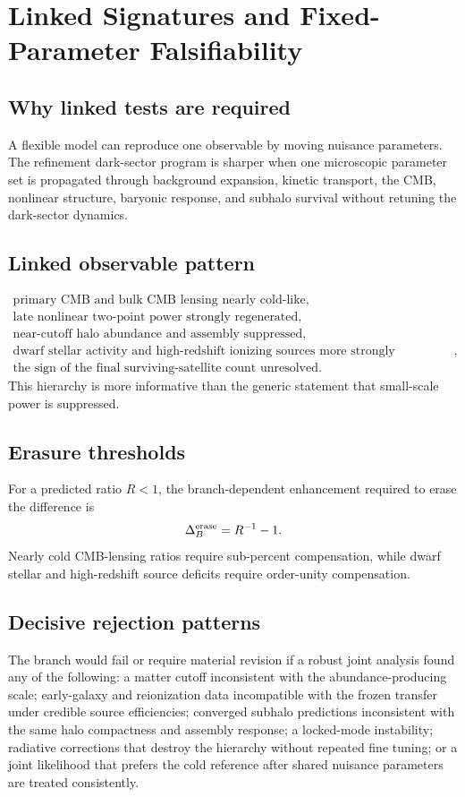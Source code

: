 \chapter{Linked Signatures and Fixed-Parameter Falsifiability}

\label{ch:linked-falsifiability}
\section{Why linked tests are required}
A flexible model can reproduce one observable by moving nuisance parameters. The refinement dark-sector program is sharper when one microscopic parameter set is propagated through background expansion, kinetic transport, the CMB, nonlinear structure, baryonic response, and subhalo survival without retuning the dark-sector dynamics.
\section{Linked observable pattern}
\begin{equation}\boxed{\begin{gathered}\text{primary CMB and bulk CMB lensing nearly cold-like},\\\text{late nonlinear two-point power strongly regenerated},\\\text{near-cutoff halo abundance and assembly suppressed},\\\text{dwarf stellar activity and high-redshift ionizing sources more strongly suppressed},\\\text{the sign of the final surviving-satellite count unresolved}.\end{gathered}}\end{equation}
This hierarchy is more informative than the generic statement that small-scale power is suppressed.
\clearpage
\section{Erasure thresholds}
For a predicted ratio $R<1$, the branch-dependent enhancement required to erase the difference is
\begin{equation}\Delta_B^{\rm erase}=R^{-1}-1.\end{equation}
Nearly cold CMB-lensing ratios require sub-percent compensation, while dwarf stellar and high-redshift source deficits require order-unity compensation.
\section{Decisive rejection patterns}
The branch would fail or require material revision if a robust joint analysis found any of the following: a matter cutoff inconsistent with the abundance-producing scale; early-galaxy and reionization data incompatible with the frozen transfer under credible source efficiencies; converged subhalo predictions inconsistent with the same halo compactness and assembly response; a locked-mode instability; radiative corrections that destroy the hierarchy without repeated fine tuning; or a joint likelihood that prefers the cold reference after shared nuisance parameters are treated consistently.
